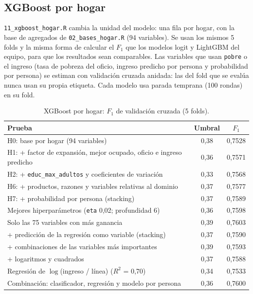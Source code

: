 \documentclass[12pt]{article}
\begin{document}
\subsection{XGBoost por hogar}
\label{sec:xgboost_hogar}

\texttt{11\_xgboost\_hogar.R} cambia la unidad del modelo: una fila por hogar,
con la base de agregados de \texttt{02\_bases\_hogar.R} (94 variables). Se
usan los mismos 5 folds y la misma forma de calcular el $F_1$ que los modelos
logit y LightGBM del equipo, para que los resultados sean comparables. Las
variables que usan \texttt{pobre} o el ingreso (tasa de pobreza del oficio,
ingreso predicho por persona y probabilidad por persona) se estiman con
validación cruzada anidada: las del fold que se evalúa nunca usan su propia
etiqueta. Cada modelo usa parada temprana (100 rondas) en su fold.

\begin{table}[H]
  \centering
  \small
  \caption{XGBoost por hogar: $F_1$ de validación cruzada (5 folds).}
  \label{tab:xgboost_hogar}
  \begin{tabular}{@{}p{8.6cm}cc@{}}
    \toprule
    Prueba & Umbral & $F_1$ \\
    \midrule
    H0: base por hogar (94 variables) & 0,38 & 0,7528 \\
    H1: + factor de expansión, mejor ocupado, oficio e ingreso predicho & 0,36 & 0,7571 \\
    H2: + \texttt{educ\_max\_adultos} y coeficientes de variación & 0,33 & 0,7568 \\
    H6: + productos, razones y variables relativas al dominio & 0,37 & 0,7577 \\
    H7: + probabilidad por persona (stacking) & 0,37 & 0,7589 \\
    Mejores hiperparámetros (\texttt{eta} 0,02; profundidad 6) & 0,36 & 0,7598 \\
    Solo las 75 variables con más ganancia & 0,39 & 0,7603 \\
    + predicción de la regresión como variable (stacking) & 0,37 & 0,7590 \\
    + combinaciones de las variables más importantes & 0,39 & 0,7593 \\
    + logaritmos y cuadrados & 0,37 & 0,7588 \\
    Regresión de $\log$(ingreso / línea) ($R^2$ = 0,70) & 0,34 & 0,7533 \\
    Combinación: clasificador, regresión y modelo por persona & 0,36 & 0,7600 \\
    \bottomrule
  \end{tabular}
\end{table}
\end{document}
